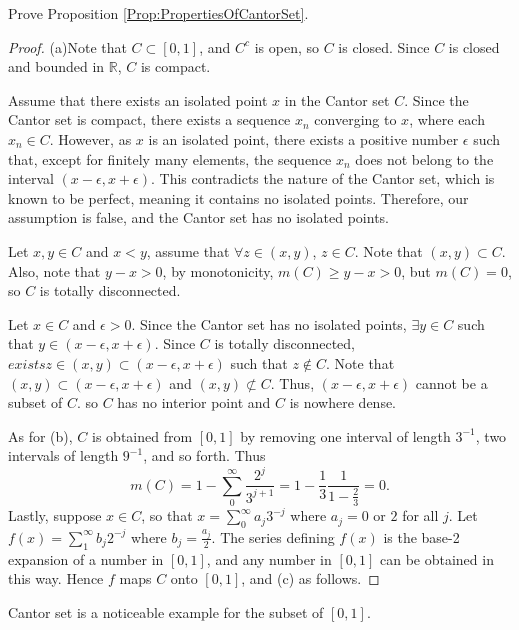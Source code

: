 \begin{exc}
    Prove Proposition \ref{Prop:PropertiesOfCantorSet}.
\end{exc}
\begin{proof}
    (a)Note that $C\subset[0,1]$, and $C^c$ is open, so $C$ is closed.
    Since $C$ is closed and bounded in $\mathbb{R}$, $C$ is compact.
    
    Assume that there exists an isolated point $x$ in the Cantor set 
    $C$. Since the Cantor set is compact, there exists a sequence ${x_n}$ 
    converging to $x$, where each $x_n\in C$. However, as $x$ is an 
    isolated point, there exists a positive number $\epsilon$ such that, 
    except for finitely many elements, the sequence ${x_n}$ does not belong
    to the interval $(x-\epsilon, x+\epsilon)$. This contradicts the nature 
    of the Cantor set, which is known to be perfect, meaning it contains no
    isolated points. Therefore, our assumption is false, and the Cantor set 
    has no isolated points. 
    
    Let $x,y\in C$ and $x<y$, assume that $\forall z\in(x,y)$, $z\in C$.
    Note that $(x,y)\subset C$. Also, note that $y-x>0$, by monotonicity,
    $m(C)\geq y-x>0$, but $m(C)=0$, so $C$ is totally disconnected.

    Let $x\in C$ and $\epsilon>0$. Since the Cantor set has no isolated points,
    $\exists y\in C$ such that $y\in(x-\epsilon,x+\epsilon)$. Since $C$ is 
    totally disconnected, $exists z\in(x,y)\subset(x-\epsilon,x+\epsilon)$
    such that $z\notin C$. Note that $(x,y)\subset(x-\epsilon,x+\epsilon)$ 
    and $(x,y)\not\subset C$. Thus, $(x-\epsilon,x+\epsilon)$  cannot be a 
    subset of $C$. so $C$ has no interior point and $C$ is nowhere dense. 
    
    As for (b), $C$ is obtained from $[0,1]$ by removing one interval of 
    length $3^{-1}$, two intervals of length $9^{-1}$, and so forth. Thus
    \begin{displaymath}
        m(C)=1-\sum_0^{\infty}\frac{2^j}{3^{j+1}}=1-\frac{1}{3}\frac{1}{1-\frac{2}{3}}=0.
    \end{displaymath}
    Lastly, suppose $x\in C$, so that $x=\sum_0^{\infty}a_j3^{-j}$ where
    $a_j=0$ or $2$ for all $j$. Let $f(x)=\sum_1^{\infty}b_j2^{-j}$ where
    $b_j=\frac{a_j}{2}$. The series defining $f(x)$ is the base-2 expansion
    of a number in $[0,1]$, and any number in $[0,1]$ can be obtained in this 
    way. Hence $f$ maps $C$ onto $[0,1]$, and (c) as follows.
\end{proof}
\begin{rem}
    Cantor set is a noticeable example 
    for the subset of $[0,1]$.
\end{rem}